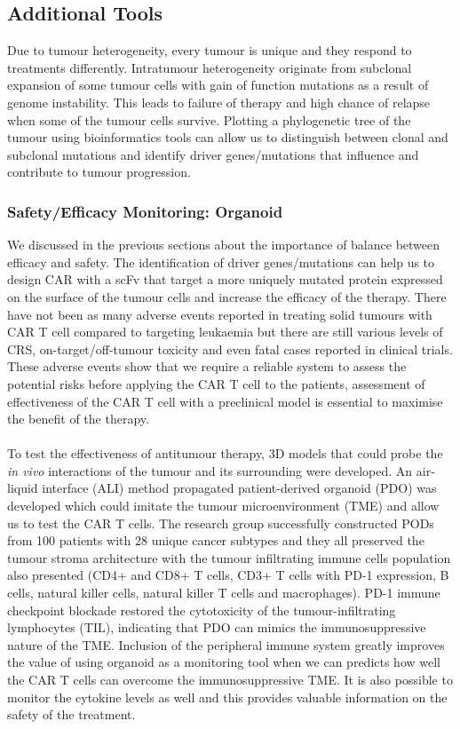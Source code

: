 \documentclass[12pt,oneside]{report}
\begin{document}
\subsection{Additional Tools}
Due to tumour heterogeneity, every tumour is unique and they respond to treatments differently\citep{heterogeneity}. Intratumour heterogeneity originate from subclonal expansion of some tumour cells with gain of function mutations as a result of genome instability. This leads to failure of therapy and high chance of relapse when some of the tumour cells survive\citep{heterogeneity}. Plotting a phylogenetic tree of the tumour using bioinformatics tools can allow us to distinguish between clonal and subclonal mutations\citep{heterogeneity} and identify driver genes/mutations that influence and contribute to tumour progression\citep{CATH}. 
\subsubsection{Safety/Efficacy Monitoring: Organoid}
We discussed in the previous sections about the importance of balance between efficacy and safety. The identification of driver genes/mutations can help us to design CAR with a scFv that target a more uniquely mutated protein expressed on the surface of the tumour cells and increase the efficacy of the therapy. There have not been as many adverse events reported in treating solid tumours with CAR T cell compared to targeting leukaemia but there are still various levels of CRS\citep{CRS-2, CRS-3}, on-target/off-tumour\citep{on-target} toxicity and even fatal cases\citep{allo-4, fatal} reported in clinical trials. These adverse events show that we require a reliable system to assess the potential risks before applying the CAR T cell to the patients, assessment of effectiveness of the CAR T cell with a preclinical model is essential to maximise the benefit of the therapy.
\\\\To test the effectiveness of antitumour therapy, 3D models that could probe the \textit{in vivo} interactions of the tumour and its surrounding were developed\citep{organoid}. An air-liquid interface (ALI) method propagated patient-derived organoid (PDO) was developed which could imitate the tumour microenvironment (TME)\citep{organoid} and allow us to test the CAR T cells. The research group successfully constructed PODs from 100 patients with 28 unique cancer subtypes and they all preserved the tumour stroma architecture with the tumour infiltrating immune cells population also presented\citep{organoid} (CD4+ and CD8+ T cells, CD3+ T cells with PD-1 expression, B cells, natural killer cells, natural killer T cells and macrophages). PD-1 immune checkpoint blockade restored the cytotoxicity of the tumour-infiltrating lymphocytes\citep{organoid} (TIL), indicating that PDO can mimics the immunosuppressive nature of the TME. Inclusion of the peripheral immune system greatly improves the value of using organoid as a monitoring tool when we can predicts how well the CAR T cells can overcome the immunosuppressive TME. It is also possible to monitor the cytokine levels as well and this provides valuable information on the safety of the treatment. 
\end{document}

